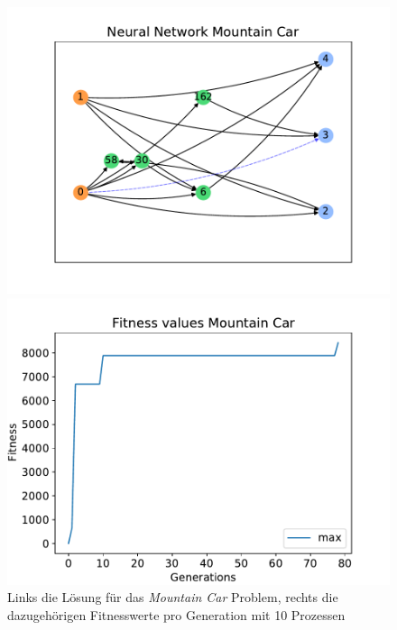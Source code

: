 \begin{figure}[!h]
	\centering
	\begin{minipage}[]{0.49\textwidth}
		\includegraphics[width=1.0\textwidth]{./img/mountain_car_single/mountain_car_neural_network.pdf} 
	\end{minipage}
	\hfill
	\begin{minipage}[]{0.49\textwidth}
		\includegraphics[width=1.0\textwidth]{./img/mountain_car_single/1413_fitness_1core_1pi.pdf} 
	\end{minipage}
	\caption{Links die Lösung für das \emph{Mountain Car} Problem, rechts die dazugehörigen Fitnesswerte pro Generation mit 10 Prozessen}
	\label{fig:mountain_car_10core_neural_network_and_fitness}
\end{figure}
